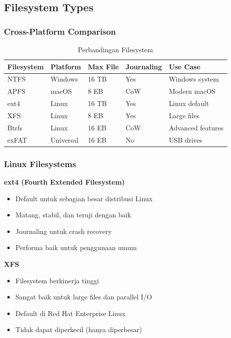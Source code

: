 \subsection{Filesystem Types}

\subsubsection{Cross-Platform Comparison}

\begin{table}[htbp]
    \centering
    \caption{Perbandingan Filesystem}
    \label{tab:filesystem-comparison}
    \begin{tabular}{@{}lllll@{}}
        \toprule
        \textbf{Filesystem} & \textbf{Platform} & \textbf{Max File} & \textbf{Journaling} & \textbf{Use Case} \\
        \midrule
        NTFS & Windows & 16 TB & Yes & Windows system \\
        APFS & macOS & 8 EB & CoW & Modern macOS \\
        ext4 & Linux & 16 TB & Yes & Linux default \\
        XFS & Linux & 8 EB & Yes & Large files \\
        Btrfs & Linux & 16 EB & CoW & Advanced features \\
        exFAT & Universal & 16 EB & No & USB drives \\
        \bottomrule
    \end{tabular}
\end{table}

\subsubsection{Linux Filesystems}

\textbf{ext4 (Fourth Extended Filesystem)}
\begin{itemize}
    \item Default untuk sebagian besar distribusi Linux
    \item Matang, stabil, dan teruji dengan baik
    \item Journaling untuk crash recovery
    \item Performa baik untuk penggunaan umum
\end{itemize}

\noindent
\textbf{XFS}
\begin{itemize}
    \item Filesystem berkinerja tinggi
    \item Sangat baik untuk large files dan parallel I/O
    \item Default di Red Hat Enterprise Linux
    \item Tidak dapat diperkecil (hanya diperbesar)
\end{itemize}

